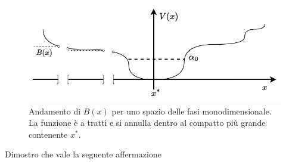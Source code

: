 \begin{steps}
    \hfill
    \begin{minipage}{.8\textwidth}
        \begin{figure}[H]
                \centering
                \includegraphics[width=\textwidth]{assets/ljapunov-aff2}
                \caption[Andamento di $B(\b x)$]{Andamento di $B(x)$ per uno
                spazio delle fasi monodimensionale. La funzione è a tratti e
                si annulla dentro al compatto più grande contenente $x^*$.}
                \label{fig:ljapunov-aff2}
        \end{figure}
    \end{minipage}

    \item Dimostro che vale la seguente affermazione


\end{steps}

